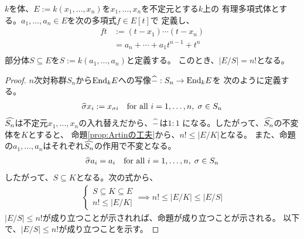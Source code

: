 {	\begin{proposition}[対称式]\label{prop:対称式} %
		$k$を体、$E:=k(x_1,\dots,x_n)$を$x_1,\dots,x_n$を不定元とする$k$上の
		有理多項式体とする。$a_1,\dots,a_n\in E$を次の多項式$f\in E[t]$で
		定義し、
		\begin{equation*}\begin{split}
			ft &:= (t - x_1)\cdots(t - x_n) \\
				&= a_n +\cdots+ a_1t^{n-1} + t^n \\
		\end{split}\end{equation*}
		部分体$S\subseteq E$を$S:=k(a_1,\dots,a_n)$と定義する。
		このとき、$|E/S|=n!$となる。
	\end{proposition} %
	\begin{proof} %
		$n$次対称群$S_n$から${\operatorname{End}}_kE$への写像$\widehat{-}:S_n\to{\ensuremath{\operatorname{End}}}_kE$を
		次のように定義する。
		\begin{equation*}\begin{split}
			\widehat{\sigma}x_i := x_{\sigma i} \quad\text{for all } i=1,\dots,n
			,\; \sigma\in S_n
		\end{split}\end{equation*}
		$\widehat{S_n}$は不定元$x_1,\dots,x_n$の入れ替えだから、$\widehat{-}$は$1:1$
		になる。したがって、$\widehat{S_n}$の不変体を$K$とすると、
		命題\ref{prop:Artinの工夫}から、$n!\le|E/K|$となる。
		また、命題の$a_1,\dots,a_n$はそれぞれ$\widehat{S_n}$の作用で不変となる。
		\begin{equation*}\begin{split}
			\widehat{\sigma}a_i = a_i \quad\text{for all } i=1,\dots,n
			,\; \sigma\in S_n
		\end{split}\end{equation*}
		したがって、$S\subseteq K$となる。次の式から、
		\begin{equation*}\begin{split}
			\left\{\begin{split}
				S\subseteq K\subseteq E \\
				n!\le|E/K|
			\end{split}\right. \implies n!\le|E/K|\le|E/S|
		\end{split}\end{equation*}
		$|E/S|\le n!$が成り立つことが示されれば、命題が成り立つことが示される。
		以下で、$|E/S|\le n!$が成り立つことを示す。


\end{proof}}
